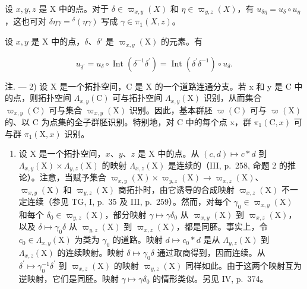 设 \(x, y, z\) 是 X 中的点。对于 \(\delta \in \varpi_{x,y}(X)\) 和 \(\eta \in \varpi_{y,z}(X)\)，有 \(u_{\delta \eta} = u_{\delta} \circ u_{\eta}\)，这也可对 \(\delta \eta \gamma = {}^{\delta}(\eta \gamma)\) 写成 \(\gamma \in \pi_1(X, z)\)。

设 \(x, y\) 是 X 中的点，\(\delta\)、\(\delta'\) 是 \(\varpi_{x,y}(\mathrm{X})\) 的元素。有

\[
u _ {\delta^ {\prime}} = u _ {\delta} \circ \operatorname{Int} (\delta^ {- 1} \delta^ {\prime}) = \operatorname{Int} (\delta^ {\prime} \delta^ {- 1}) \circ u _ {\delta}.\tag{7}
\]

注. --- 2) 设 X 是一个拓扑空间，C 是 X 的一个道路连通分支。若 x 和 y 是 C 中的点，则拓扑空间 \(\Lambda_{x,y}(\mathrm{C})\) 可与拓扑空间 \(\Lambda_{x,y}(\mathrm{X})\) 识别，从而集合 \(\varpi_{x,y}(\mathrm{C})\) 可与集合 \(\varpi_{x,y}(\mathrm{X})\) 识别。因此，基本群胚 \(\varpi(\mathrm{C})\) 可与 \(\varpi(\mathrm{X})\) 的、以 C 为点集的全子群胚识别。特别地，对 C 中的每个点 x，群 \(\pi_1(\mathrm{C}, x)\) 可与群 \(\pi_1(\mathrm{X}, x)\) 识别。

\begin{enumerate}
\def\labelenumi{\arabic{enumi})}
\setcounter{enumi}{2}
\tightlist
\item
  设 X 是一个拓扑空间，\(x\)、\(y\)、\(z\) 是 X 中的点。从 \((c,d)\mapsto c*d\) 到 \(\Lambda_{x,y}(\mathrm{X})\times \Lambda_{y,z}(\mathrm{X})\) 的映射 \(\Lambda_{x,z}(\mathrm{X})\) 是连续的（III, p.~258, 命题 2 的推论）。注意，当赋予集合 \(\varpi_{x,y}(\mathrm{X})\times \varpi_{y,z}(\mathrm{X})\to \varpi_{x,z}(\mathrm{X})\)、\(\varpi_{x,y}(\mathrm{X})\) 和 \(\varpi_{y,z}(\mathrm{X})\) 商拓扑时，由它诱导的合成映射 \(\varpi_{x,z}(\mathrm{X})\) 不一定连续（参见 TG, I, p.~35 及 III, p.~259）。然而，对每个 \(\gamma_0\in \varpi_{x,y}(\mathrm{X})\) 和每个 \(\delta_0\in \varpi_{y,z}(\mathrm{X})\)，部分映射 \(\gamma \mapsto \gamma \delta_0\) 从 \(\varpi_{x,y}(\mathrm{X})\) 到 \(\varpi_{x,z}(\mathrm{X})\)，以及 \(\delta \mapsto \gamma_0\delta\) 从 \(\varpi_{y,z}(\mathrm{X})\) 到 \(\varpi_{x,z}(\mathrm{X})\)，都是同胚。事实上，令 \(c_0\in \Lambda_{x,y}(\mathrm{X})\) 为类为 \(\gamma_0\) 的道路。映射 \(d\mapsto c_0*d\) 是从 \(\Lambda_{y,z}(\mathrm{X})\) 到 \(\Lambda_{x,z}(\mathrm{X})\) 的连续映射。映射 \(\delta \mapsto \gamma_0\delta\) 通过取商得到，因而连续。从 \(\delta^{\prime}\mapsto \gamma_{0}^{-1}\delta^{\prime}\) 到 \(\varpi_{x,z}(\mathrm{X})\) 的映射 \(\varpi_{y,z}(\mathrm{X})\) 同样如此。由于这两个映射互为逆映射，它们是同胚。映射 \(\gamma \mapsto \gamma \delta_0\) 的情形类似。另见 IV, p.~374。
\end{enumerate}

